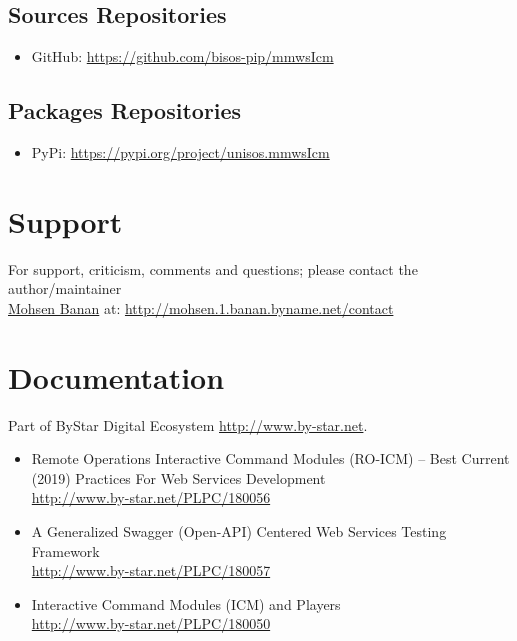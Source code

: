 \documentclass{article}
\begin{document}
\subsection{Sources Repositories}

\begin{itemize}
\item GitHub:   \url{https://github.com/bisos-pip/mmwsIcm}
\end{itemize}

\subsection{Packages Repositories}

\begin{itemize}
\item PyPi:   \url{https://pypi.org/project/unisos.mmwsIcm}
\end{itemize}

\section{Support}

For support, criticism, comments and questions; please contact the 
author/maintainer \\
\href{http://mohsen.1.banan.byname.net}{Mohsen Banan} at: \url{http://mohsen.1.banan.byname.net/contact}


\section{Documentation}

Part of ByStar Digital Ecosystem \url{http://www.by-star.net}.


\begin{itemize}
\item Remote Operations Interactive Command Modules (RO-ICM) -- Best Current (2019) Practices For Web Services Development\\
  \url{http://www.by-star.net/PLPC/180056}
\item A Generalized Swagger (Open-API) Centered Web Services Testing Framework\\
 \url{http://www.by-star.net/PLPC/180057}
\item Interactive Command Modules (ICM) and Players\\
 \url{http://www.by-star.net/PLPC/180050}
\end{itemize}
\end{document}
